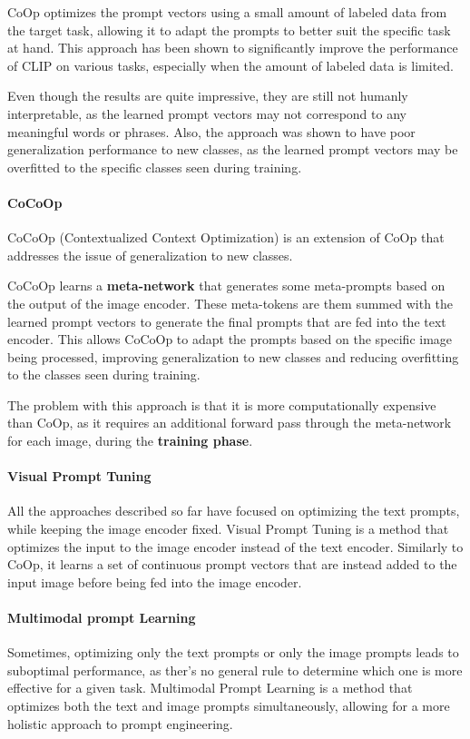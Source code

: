 CoOp optimizes the prompt vectors using a small amount of labeled data from the target task, allowing it to adapt the prompts to better suit the specific task at hand.
This approach has been shown to significantly improve the performance of CLIP on various tasks, especially when the amount of labeled data is limited.

Even though the results are quite impressive, they are still not humanly interpretable, as the learned prompt vectors may not correspond to any meaningful words or phrases.
Also, the approach was shown to have poor generalization performance to new classes, as the learned prompt vectors may be overfitted to the specific classes seen during training.

\paragraph{CoCoOp}
CoCoOp (Contextualized Context Optimization) is an extension of CoOp that addresses the issue of generalization to new classes. 

CoCoOp learns a \textbf{meta-network} that generates some meta-prompts based on the output of the image encoder. These meta-tokens
are them summed with the learned prompt vectors to generate the final prompts that are fed into the text encoder.
This allows CoCoOp to adapt the prompts based on the specific image being processed, improving generalization to new classes and reducing overfitting to the classes seen during training.

The problem with this approach is that it is more computationally expensive than CoOp, as it requires an additional forward pass through the meta-network for each image,
during the \textbf{training phase}.

\paragraph{Visual Prompt Tuning}
All the approaches described so far have focused on optimizing the text prompts, while keeping the image encoder fixed.
Visual Prompt Tuning is a method that optimizes the input to the image encoder instead of the text encoder. 
Similarly to CoOp, it learns a set of continuous prompt vectors that are instead added to the input image before being fed into the image encoder.

\paragraph{Multimodal prompt Learning}
Sometimes, optimizing only the text prompts or only the image prompts leads to suboptimal performance, as ther's no general rule to determine which one is more effective for a given task.
Multimodal Prompt Learning is a method that optimizes both the text and image prompts simultaneously, allowing for a more holistic approach to prompt engineering.

